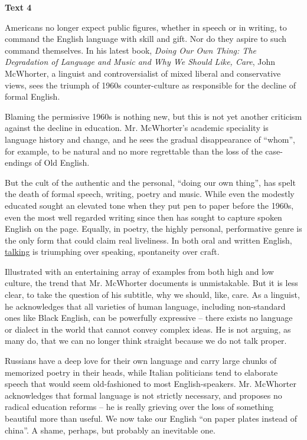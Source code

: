 \begin{center}\textbf{Text 4}\end{center}

\qquad Americans no longer expect public figures, whether in speech or in writing, to command the English language with skill and gift. Nor do they aspire to such command themselves. In his latest book, \emph{Doing Our Own Thing: The Degradation of Language and Music and Why We Should Like, Care}, John McWhorter, a linguist and controversialist of mixed liberal and conservative views, sees the triumph of 1960s counter-culture as responsible for the decline of formal English.

\qquad Blaming the permissive 1960s is nothing new, but this is not yet another criticism against the decline in education. Mr. McWhorter's academic speciality is language history and change, and he sees the gradual disappearance of ``whom'', for example, to be natural and no more regrettable than the loss of the case-endings of Old English.

\qquad But the cult of the authentic and the personal, ``doing our own thing'', has spelt the death of formal speech, writing, poetry and music. While even the modestly educated sought an elevated tone when they put pen to paper before the 1960s, even the most well regarded writing since then has sought to capture spoken English on the page. Equally, in poetry, the highly personal, performative genre is the only form that could claim real liveliness. In both oral and written English, \ul{talking} is triumphing over speaking, spontaneity over craft.

\qquad Illustrated with an entertaining array of examples from both high and low culture, the trend that Mr. McWhorter documents is unmistakable. But it is less clear, to take the question of his subtitle, why we should, like, care. As a linguist, he acknowledges that all varieties of human language, including non-standard ones like Black English, can be powerfully expressive -- there exists no language or dialect in the world that cannot convey complex ideas. He is not arguing, as many do, that we can no longer think straight because we do not talk proper.

\qquad Russians have a deep love for their own language and carry large chunks of memorized poetry in their heads, while Italian politicians tend to elaborate speech that would seem old-fashioned to most English-speakers. Mr. McWhorter acknowledges that formal language is not strictly necessary, and proposes no radical education reforms -- he is really grieving over the loss of something beautiful more than useful. We now take our English ``on paper plates instead of china''. A shame, perhaps, but probably an inevitable one.

